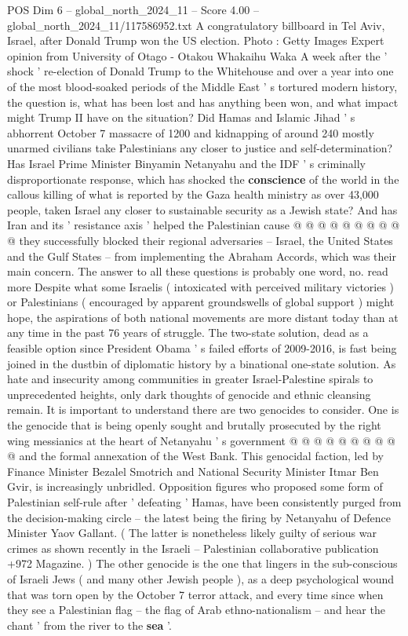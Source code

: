 \begin{textsample}{POS Dim 6 – global\_north\_2024\_11 – Score 4.00 – global\_north\_2024\_11/117586952.txt}  \label{ex:f6_pos_289}
A congratulatory billboard in Tel Aviv, Israel, after Donald Trump won the US election.
Photo : Getty Images Expert opinion from University of Otago - Otakou Whakaihu Waka A week after the ' shock ' re-election of Donald Trump to the Whitehouse and over a year into one of the most blood-soaked periods of the Middle East ' s tortured modern history, the question is, what has been lost and has anything been won, and what impact might Trump II have on the situation?
Did Hamas and Islamic Jihad ' s abhorrent October 7 massacre of 1200 and kidnapping of around 240 mostly unarmed civilians take Palestinians any closer to justice and self-determination?
Has Israel Prime Minister Binyamin Netanyahu and the IDF ' s criminally disproportionate response, which has shocked the \textbf{conscience} of the world in the callous killing of what is reported by the Gaza health ministry as over 43,000 people, taken Israel any closer to sustainable security as a Jewish state?
And has Iran and its ' resistance axis ' helped the Palestinian cause @ @ @ @ @ @ @ @ @ @ they successfully blocked their regional adversaries -- Israel, the United States and the Gulf States -- from implementing the Abraham Accords, which was their main concern.
The answer to all these questions is probably one word, no. read more Despite what some Israelis ( intoxicated with perceived military victories ) or Palestinians ( encouraged by apparent groundswells of global support ) might hope, the aspirations of both national movements are more distant today than at any time in the past 76 years of struggle.
The two-state solution, dead as a feasible option since President Obama ' s failed efforts of 2009-2016, is fast being joined in the dustbin of diplomatic history by a binational one-state solution.
As hate and insecurity among communities in greater Israel-Palestine spirals to unprecedented heights, only dark thoughts of genocide and ethnic cleansing remain.
It is important to understand there are two genocides to consider.
One is the genocide that is being openly sought and brutally prosecuted by the right wing messianics at the heart of Netanyahu ' s government @ @ @ @ @ @ @ @ @ @ and the formal annexation of the West Bank.
This genocidal faction, led by Finance Minister Bezalel Smotrich and National Security Minister Itmar Ben Gvir, is increasingly unbridled.
Opposition figures who proposed some form of Palestinian self-rule after ' defeating ' Hamas, have been consistently purged from the decision-making circle -- the latest being the firing by Netanyahu of Defence Minister Yaov Gallant. ( The latter is nonetheless likely guilty of serious war crimes as shown recently in the Israeli -- Palestinian collaborative publication +972 Magazine. ) The other genocide is the one that lingers in the sub-conscious of Israeli Jews ( and many other Jewish people ), as a deep psychological wound that was torn open by the October 7 terror attack, and every time since when they see a Palestinian flag -- the flag of Arab ethno-nationalism -- and hear the chant ' from the river to the \textbf{sea} '.

\end{textsample}

